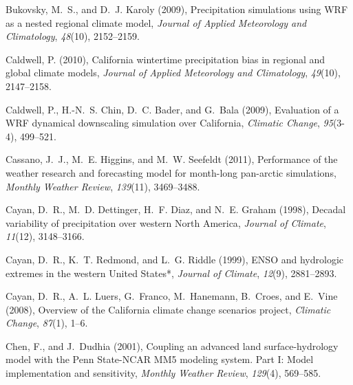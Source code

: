 \documentclass[ms]{agutex}   %
\begin{document}
\begin{article}
\begin{thebibliography}{84}
Bukovsky, M.~S., and D.~J. Karoly (2009), {Precipitation simulations using WRF
  as a nested regional climate model}, \textit{Journal of Applied Meteorology
  and Climatology}, \textit{48}(10), 2152--2159.

Caldwell, P. (2010), California wintertime precipitation bias in regional and
  global climate models, \textit{Journal of Applied Meteorology and
  Climatology}, \textit{49}(10), 2147--2158.

Caldwell, P., H.-N.~S. Chin, D.~C. Bader, and G.~Bala (2009), {Evaluation of a
  WRF dynamical downscaling simulation over California}, \textit{Climatic
  Change}, \textit{95}(3-4), 499--521.

Cassano, J.~J., M.~E. Higgins, and M.~W. Seefeldt (2011), Performance of the
  weather research and forecasting model for month-long pan-arctic simulations,
  \textit{Monthly Weather Review}, \textit{139}(11), 3469--3488.

Cayan, D.~R., M.~D. Dettinger, H.~F. Diaz, and N.~E. Graham (1998), {Decadal
  variability of precipitation over western North America}, \textit{Journal of
  Climate}, \textit{11}(12), 3148--3166.

Cayan, D.~R., K.~T. Redmond, and L.~G. Riddle (1999), {ENSO and hydrologic
  extremes in the western United States*}, \textit{Journal of Climate},
  \textit{12}(9), 2881--2893.

Cayan, D.~R., A.~L. Luers, G.~Franco, M.~Hanemann, B.~Croes, and E.~Vine
  (2008), {Overview of the California climate change scenarios project},
  \textit{Climatic Change}, \textit{87}(1), 1--6.

Chen, F., and J.~Dudhia (2001), {Coupling an advanced land surface-hydrology
  model with the Penn State-NCAR MM5 modeling system. Part I: Model
  implementation and sensitivity}, \textit{Monthly Weather Review},
  \textit{129}(4), 569--585.


\end{thebibliography}
\end{article}
\end{document}
